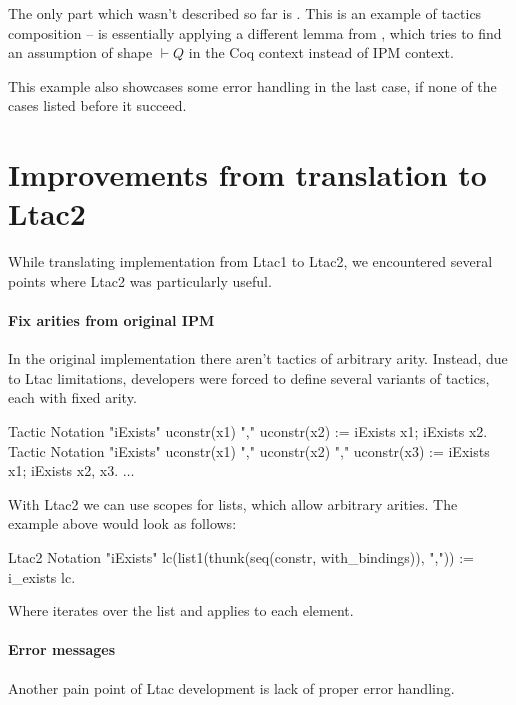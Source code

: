 The only part which wasn't described so far is .
This is an example of tactics composition --  is essentially applying a different lemma from , which tries to find an assumption of shape \(\vdash Q\) in the Coq context instead of IPM context.

This example also showcases some error handling in the last case, if none of the cases listed before it succeed.

\section{Improvements from translation to Ltac2}

While translating implementation from Ltac1 to Ltac2, we encountered several points where Ltac2 was particularly useful.

\paragraph{Fix arities from original IPM}

In the original implementation there aren't tactics of arbitrary arity.
Instead, due to Ltac limitations, developers were forced to define several variants of tactics, each with fixed arity.

\begin{coq}
Tactic Notation "iExists" uconstr(x1) "," uconstr(x2) :=
  iExists x1; iExists x2.
Tactic Notation "iExists" uconstr(x1) "," uconstr(x2) "," uconstr(x3) :=
  iExists x1; iExists x2, x3.
$\ldots$
\end{coq}

With Ltac2 we can use scopes for lists, which allow arbitrary arities.
The example above would look as follows:

\begin{coq}
  Ltac2 Notation "iExists" lc(list1(thunk(seq(constr, with_bindings)), ",")) :=
  i_exists$\text{~}$lc.
\end{coq}

Where  iterates over the list and applies  to each element.

\paragraph{Error messages}

Another pain point of Ltac development is lack of proper error handling.

